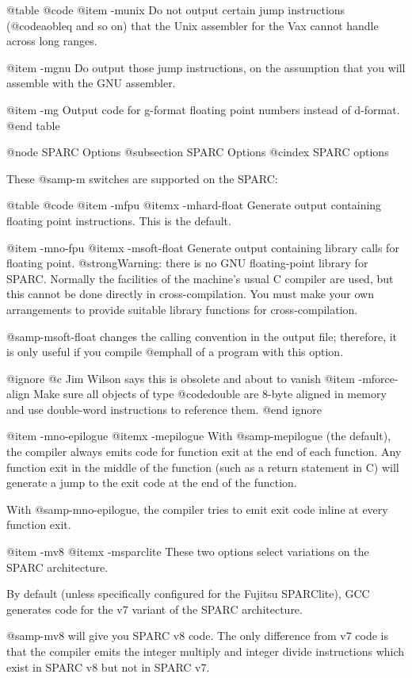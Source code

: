 {{@table @code
@item -munix
Do not output certain jump instructions (@code{aobleq} and so on)
that the Unix assembler for the Vax cannot handle across long
ranges.

@item -mgnu
Do output those jump instructions, on the assumption that you
will assemble with the GNU assembler.

@item -mg
Output code for g-format floating point numbers instead of d-format.
@end table

@node SPARC Options
@subsection SPARC Options
@cindex SPARC options

These @samp{-m} switches are supported on the SPARC:

@table @code
@item -mfpu
@itemx -mhard-float
Generate output containing floating point instructions.  This is the
default.

@item -mno-fpu
@itemx -msoft-float
Generate output containing library calls for floating point.
@strong{Warning:} there is no GNU floating-point library for SPARC.
Normally the facilities of the machine's usual C compiler are used, but
this cannot be done directly in cross-compilation.  You must make your
own arrangements to provide suitable library functions for
cross-compilation.

@samp{-msoft-float} changes the calling convention in the output file;
therefore, it is only useful if you compile @emph{all} of a program with
this option.

@ignore
@c Jim Wilson says this is obsolete and about to vanish
@item -mforce-align
Make sure all objects of type @code{double} are 8-byte aligned in memory
and use double-word instructions to reference them.
@end ignore

@item -mno-epilogue
@itemx -mepilogue
With @samp{-mepilogue} (the default), the compiler always emits code for
function exit at the end of each function.  Any function exit in
the middle of the function (such as a return statement in C) will
generate a jump to the exit code at the end of the function.

With @samp{-mno-epilogue}, the compiler tries to emit exit code inline
at every function exit.

@item -mv8
@itemx -msparclite
These two options select variations on the SPARC architecture.

By default (unless specifically configured for the Fujitsu SPARClite),
GCC generates code for the v7 variant of the SPARC architecture.

@samp{-mv8} will give you SPARC v8 code.  The only difference from v7
code is that the compiler emits the integer multiply and integer
divide instructions which exist in SPARC v8 but not in SPARC v7.

}}
